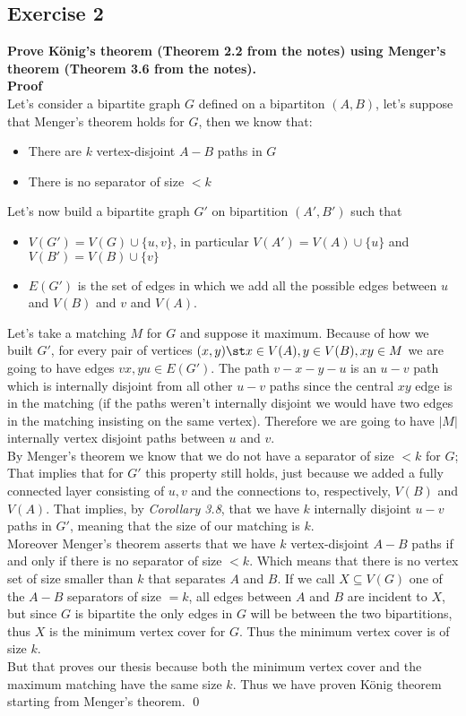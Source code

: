\subsection*{Exercise 2}
\boldmath
\textbf{Prove König’s theorem (Theorem 2.2 from the notes) using Menger’s theorem (Theorem 3.6 from the notes).\\\linebreak Proof\\}
\unboldmath
Let's consider a bipartite graph $G$ defined on a bipartiton $(A, B)$, let's suppose that Menger's theorem holds for $G$, then we know that:
\begin{itemize}
    \item There are $k$ vertex-disjoint $A-B$ paths in $G$
    \item There is no separator of size $< k$
\end{itemize}
Let's now build a bipartite graph $G'$ on bipartition $(A', B')$ such that 
\begin{itemize}
    \item $V(G') = V(G) \cup \{u, v\}$, in particular $V(A') = V(A) \cup \{u\}$ and $V(B') = V(B) \cup \{v\}$
    \item $E(G')$ is the set of edges in which we add all the possible edges between $u$ and $V(B)$ and $v$ and $V(A)$.
\end{itemize}
Let's take a matching $M$ for $G$ and suppose it maximum. Because of how we built $G'$, for every pair of vertices $(x, y) \st x \in V(A), y \in V(B), xy \in M$ we are going to have edges $vx, yu \in E(G')$. The path $v-x-y-u$ is an $u-v$ path which is internally disjoint from all other $u-v$ paths since the central $xy$ edge is in the matching (if the paths weren't internally disjoint we would have two edges in the matching insisting on the same vertex). Therefore we are going to have $|M|$ internally vertex disjoint paths between $u$ and $v$.\\\linebreak
By Menger's theorem we know that we do not have a separator of size $< k$ for $G$; That implies that for $G'$ this property still holds, just because we added a fully connected layer consisting of $u, v$ and the connections to, respectively, $V(B)$ and $V(A)$. That implies, by \textit{Corollary 3.8}, that we have $k$ internally disjoint $u - v$ paths in $G'$, meaning that the size of our matching is $k$.\\\linebreak
Moreover Menger's theorem asserts that we have $k$ vertex-disjoint $A-B$ paths if and only if there is no separator of size $< k$. Which means that there is no vertex set of size smaller than $k$ that separates $A$ and $B$. If we call $X \subseteq V(G)$ one of the $A-B$ separators of size $= k$,  all edges between $A$ and $B$ are incident to $X$, but since $G$ is bipartite the only edges in $G$ will be between the two bipartitions, thus $X$ is the minimum vertex cover for $G$. Thus the minimum vertex cover is of size $k$.\\\linebreak
But that proves our thesis because both the minimum vertex cover and the maximum matching have the same size $k$. Thus we have proven König theorem starting from Menger's theorem. \qed